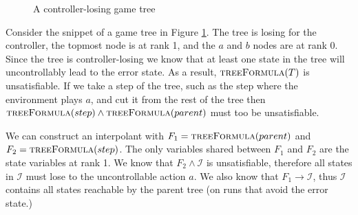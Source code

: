 \documentclass{llncs}
\begin{document}
\begin{figure}
    \centering
    \caption{A controller-losing game tree}
    \label{fig:interpolatetree}
\end{figure}

Consider the snippet of a game tree in Figure \ref{fig:interpolatetree}. The
tree is losing for the controller, the topmost node is at rank 1, and the $a$ and
$b$ nodes are at rank 0. Since the tree is controller-losing we know that at
least one state in the tree will uncontrollably lead to the error state.  As a
result, $\textsc{treeFormula}(T)$ is unsatisfiable. If we take a step of the
tree, such as the step where the environment plays $a$, and cut it from the
rest of the tree then $\textsc{treeFormula}(step) \land
\textsc{treeFormula}(parent)$ must too be unsatisfiable.

We can construct an interpolant with $F_1 = \textsc{treeFormula}(parent)$ and
$F_2 = \textsc{treeFormula}(step)$. The only variables shared between $F_1$ and
$F_2$ are the state variables at rank 1. We know that $F_2 \land \mathcal{I}$
is unsatisfiable, therefore all states in $\mathcal{I}$ must lose to the
uncontrollable action $a$. We also know that $F_1 \to \mathcal{I}$, thus
$\mathcal{I}$ contains all states reachable by the parent tree (on runs that
avoid the error state.)
\end{document}
